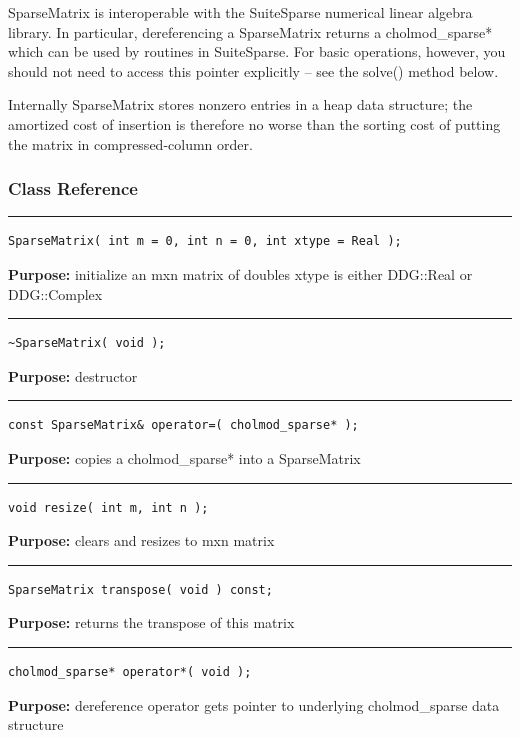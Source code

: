 \documentclass{article}
\begin{document}
 SparseMatrix is interoperable with the SuiteSparse numerical linear algebra library.  In particular, dereferencing a SparseMatrix returns a cholmod\_sparse* which can be used by routines in SuiteSparse.  For basic operations, however, you should not need to access this pointer explicitly -- see the solve() method below. 

 Internally SparseMatrix stores nonzero entries in a heap data structure; the amortized cost of insertion is therefore no worse than the sorting cost of putting the matrix in compressed-column order. 



\subsubsection{Class Reference}

\rule{5in}{1pt}
\begin{verbatim}
SparseMatrix( int m = 0, int n = 0, int xtype = Real );
\end{verbatim}
\textbf{Purpose:}
initialize an mxn matrix of doubles
xtype is either DDG::Real or DDG::Complex

\hspace{-.21in}\rule{5in}{1pt}
\begin{verbatim}
~SparseMatrix( void );
\end{verbatim}
\textbf{Purpose:}
destructor

\hspace{-.21in}\rule{5in}{1pt}
\begin{verbatim}
const SparseMatrix& operator=( cholmod_sparse* );
\end{verbatim}
\textbf{Purpose:}
copies a cholmod\_sparse* into a SparseMatrix

\hspace{-.21in}\rule{5in}{1pt}
\begin{verbatim}
void resize( int m, int n );
\end{verbatim}
\textbf{Purpose:}
clears and resizes to mxn matrix

\hspace{-.21in}\rule{5in}{1pt}
\begin{verbatim}
SparseMatrix transpose( void ) const;
\end{verbatim}
\textbf{Purpose:}
returns the transpose of this matrix

\hspace{-.21in}\rule{5in}{1pt}
\begin{verbatim}
cholmod_sparse* operator*( void );
\end{verbatim}
\textbf{Purpose:}
dereference operator gets pointer to underlying cholmod\_sparse data structure
\end{document}
